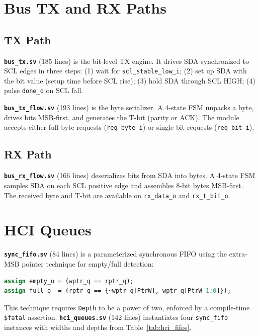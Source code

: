 \documentclass[12pt, a4paper, oneside]{report}
\newcommand{\signal}[1]{\texttt{#1}}
\newcommand{\file}[1]{\texttt{#1}}
\newcommand{\module}[1]{\texttt{#1}}
\begin{document}
\section{Bus TX and RX Paths}

\subsection{TX Path}

\textbf{\file{bus\_tx.sv}} (185 lines) is the bit-level TX engine. It drives SDA
synchronized to SCL edges in three steps: (1) wait for \signal{scl\_stable\_low\_i};
(2) set up SDA with the bit value (setup time before SCL rise); (3) hold SDA through
SCL HIGH; (4) pulse \signal{done\_o} on SCL fall.

\textbf{\file{bus\_tx\_flow.sv}} (193 lines) is the byte serializer. A 4-state FSM
unpacks a byte, drives bits MSB-first, and generates the T-bit (parity or ACK). The
module accepts either full-byte requests (\signal{req\_byte\_i}) or single-bit
requests (\signal{req\_bit\_i}).

\subsection{RX Path}

\textbf{\file{bus\_rx\_flow.sv}} (166 lines) deserializes bits from SDA into bytes.
A 4-state FSM samples SDA on each SCL positive edge and assembles 8-bit bytes
MSB-first. The received byte and T-bit are available on \signal{rx\_data\_o} and
\signal{rx\_t\_bit\_o}.

\section{HCI Queues}

\textbf{\file{sync\_fifo.sv}} (84 lines) is a parameterized synchronous FIFO using
the extra-MSB pointer technique for empty/full detection:

\begin{lstlisting}[language=SystemVerilog, caption={FIFO full/empty detection}]
assign empty_o = (wptr_q == rptr_q);
assign full_o  = (rptr_q == {~wptr_q[PtrW], wptr_q[PtrW-1:0]});
\end{lstlisting}

This technique requires \texttt{Depth} to be a power of two, enforced by a compile-time
\lstinline{$fatal} assertion. \textbf{\file{hci\_queues.sv}} (142 lines) instantiates
four \module{sync\_fifo} instances with widths and depths from Table~\ref{tab:hci_fifos}.
\end{document}
